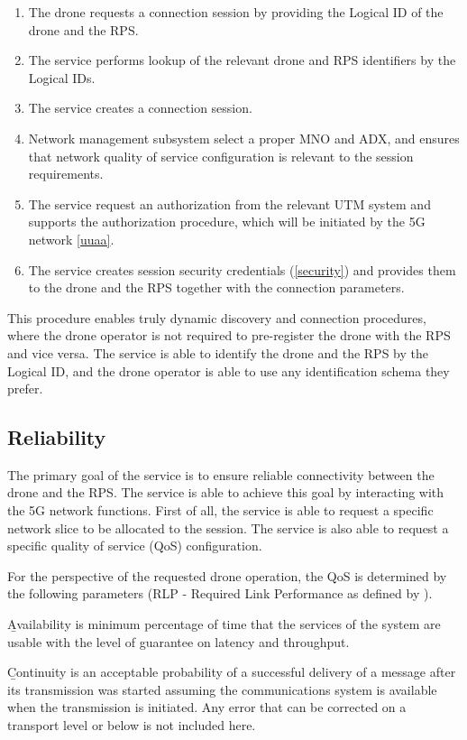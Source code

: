 \documentclass[a4paper,conference]{IEEEtran}
\begin{document}
\begin{enumerate}
\item The drone requests a connection session by providing the Logical ID of the drone and the RPS.
\item The service performs lookup of the relevant drone and RPS identifiers by the Logical IDs.
\item The service creates a connection session.
\item Network management subsystem select a proper MNO and ADX, and ensures that network quality of service configuration is relevant to the session requirements.
\item The service request an authorization from the relevant UTM system and supports the authorization procedure, which will be initiated by the 5G network \ref{uuaa}.
\item The service creates session security credentials (\ref{security}) and provides them to the drone and the RPS together with the connection parameters.
\end{enumerate}

This procedure enables truly dynamic discovery and connection procedures, where the drone operator is not required to pre-register the drone with the RPS and vice versa. The service is able to identify the drone and the RPS by the Logical ID, and the drone operator is able to use any identification schema they prefer.

\subsection{Reliability}

The primary goal of the service is to ensure reliable connectivity between the drone and the RPS. The service is able to achieve this goal by interacting with the 5G network functions. First of all, the service is able to request a specific network slice to be allocated to the session. The service is also able to request a specific quality of service (QoS) configuration.

For the perspective of the requested drone operation, the QoS is determined by the following parameters (RLP - Required Link Performance as defined by \cite{rtca:do377a}).

{\b Availability} is minimum percentage of time that the services of the system are usable with the level of guarantee on latency and throughput.

{\b Continuity} is an acceptable probability of a successful delivery of a message after its transmission was started assuming the communications system is available when the transmission is initiated. Any error that can be corrected on a transport level or below is not included here.
\end{document}
